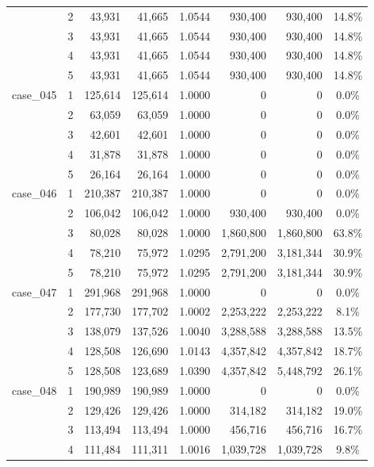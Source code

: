 \begin{footnotesize}
\begin{longtable}{l c rr c rr c}
 & 2 & 43{,}931 & 41{,}665 & 1.0544 & 930{,}400 & 930{,}400 & 14.8\% \\
 & 3 & 43{,}931 & 41{,}665 & 1.0544 & 930{,}400 & 930{,}400 & 14.8\% \\
 & 4 & 43{,}931 & 41{,}665 & 1.0544 & 930{,}400 & 930{,}400 & 14.8\% \\
 & 5 & 43{,}931 & 41{,}665 & 1.0544 & 930{,}400 & 930{,}400 & 14.8\% \\
\addlinespace[2pt]
case\_045 & 1 & 125{,}614 & 125{,}614 & 1.0000 & 0 & 0 & 0.0\% \\
 & 2 & 63{,}059 & 63{,}059 & 1.0000 & 0 & 0 & 0.0\% \\
 & 3 & 42{,}601 & 42{,}601 & 1.0000 & 0 & 0 & 0.0\% \\
 & 4 & 31{,}878 & 31{,}878 & 1.0000 & 0 & 0 & 0.0\% \\
 & 5 & 26{,}164 & 26{,}164 & 1.0000 & 0 & 0 & 0.0\% \\
\addlinespace[2pt]
case\_046 & 1 & 210{,}387 & 210{,}387 & 1.0000 & 0 & 0 & 0.0\% \\
 & 2 & 106{,}042 & 106{,}042 & 1.0000 & 930{,}400 & 930{,}400 & 0.0\% \\
 & 3 & 80{,}028 & 80{,}028 & 1.0000 & 1{,}860{,}800 & 1{,}860{,}800 & 63.8\% \\
 & 4 & 78{,}210 & 75{,}972 & 1.0295 & 2{,}791{,}200 & 3{,}181{,}344 & 30.9\% \\
 & 5 & 78{,}210 & 75{,}972 & 1.0295 & 2{,}791{,}200 & 3{,}181{,}344 & 30.9\% \\
\addlinespace[2pt]
case\_047 & 1 & 291{,}968 & 291{,}968 & 1.0000 & 0 & 0 & 0.0\% \\
 & 2 & 177{,}730 & 177{,}702 & 1.0002 & 2{,}253{,}222 & 2{,}253{,}222 & 8.1\% \\
 & 3 & 138{,}079 & 137{,}526 & 1.0040 & 3{,}288{,}588 & 3{,}288{,}588 & 13.5\% \\
 & 4 & 128{,}508 & 126{,}690 & 1.0143 & 4{,}357{,}842 & 4{,}357{,}842 & 18.7\% \\
 & 5 & 128{,}508 & 123{,}689 & 1.0390 & 4{,}357{,}842 & 5{,}448{,}792 & 26.1\% \\
\addlinespace[2pt]
case\_048 & 1 & 190{,}989 & 190{,}989 & 1.0000 & 0 & 0 & 0.0\% \\
 & 2 & 129{,}426 & 129{,}426 & 1.0000 & 314{,}182 & 314{,}182 & 19.0\% \\
 & 3 & 113{,}494 & 113{,}494 & 1.0000 & 456{,}716 & 456{,}716 & 16.7\% \\
 & 4 & 111{,}484 & 111{,}311 & 1.0016 & 1{,}039{,}728 & 1{,}039{,}728 & 9.8\% \\

\end{longtable}
\end{footnotesize}
